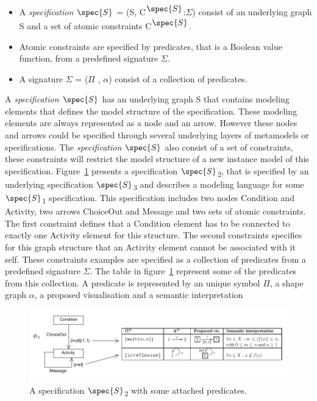 \begin{itemize}
  
\item A \emph{specification $\spec{S}$} = (S,
C\textsuperscript{$\spec{S}$}:$\Sigma$) consist of an underlying graph S and a
set of atomic constraints C\textsuperscript{$\spec{S}$}. 

\item Atomic constraints are specified by predicates, that is a Boolean value
function, from a predefined signature $\Sigma$.

\item A signature $\Sigma$ = ($\Pi$ \hspace{1 mm}, \hspace{1 mm}$\alpha$)
consist of a collection of predicates. 
  
\end{itemize}

A \emph{specification $\spec{S}$} has an underlying graph S that contains
modeling elements that defines the model structure of the specification. These
modeling elements are always represented as a node and an arrow. However these
nodes and arrows could be specified through several underlying layers of
metamodels or specifications. The \emph{specification $\spec{S}$} also consist
of a set of constraints, these constraints will restrict the model structure of
a new instance model of this specification. Figure~\ref{fig:DPF_Spec} presents a
specification $\spec{S}$\textsubscript{2}, that is specified by an underlying
specification $\spec{S}$\textsubscript{3} and describes a modeling language for
some $\spec{S}$\textsubscript{1} specification. This specification includes two
nodes Condition and Activity, two arrows ChoiceOut and Message and  two sets of
atomic constraints. The first constraint defines that a Condition element has
to be connected to exactly one Activity element for this structure. The second
constraints specifies for this graph structure that an Activity element cannot
be associated with it self. These constraints examples are specified as a
collection of predicates from a predefined signature $\Sigma$. The table in
figure~\ref{fig:DPF_Spec} represent some of the predicates from this
collection. A predicate is represented by an unique symbol $\Pi$, a shape graph
$\alpha$, a proposed visualisation and a semantic interpretation

\begin{figure}[H]
	\centering
	\includegraphics[scale=0.7]{./Figures/DPF_spec_constraints.png}
	\caption[A specification and some predefined diagrammatic predicate attached]
	{A specification $\spec{S}$\textsubscript{2} with some attached predicates.}
	\label{fig:DPF_Spec}
\end{figure}

